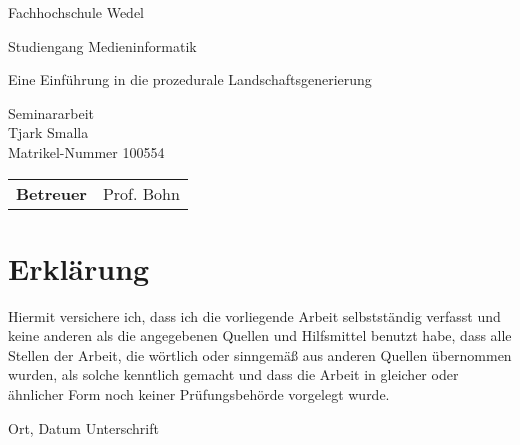 
\pagestyle{empty} %

\clearscrheadings\clearscrplain
\begin{center}
\begin{Huge}
Fachhochschule Wedel\\
\vspace{3mm}
\end{Huge}
{\Large Studiengang Medieninformatik}\\

\vspace{20mm}
\begin{Large}
Eine Einführung in die prozedurale Landschaftsgenerierung\\
\end{Large}
\vspace{8mm}
Seminararbeit\\
\vspace{0.4cm}
\vspace{2 cm}
Tjark Smalla \\
Matrikel-Nummer 100554\\
\vspace{8cm}
\begin{tabular}{rl}
{\bfseries Betreuer} & Prof. Bohn\\
\end{tabular}

\end{center}
\clearpage


\pagestyle{useheadings} %

\tableofcontents %
\listoffigures %
\listoftables %
















\chapter*{Erklärung}

Hiermit versichere ich, dass ich die vorliegende Arbeit selbstständig verfasst und keine anderen als die angegebenen Quellen und Hilfsmittel benutzt habe, dass alle Stellen der Arbeit, die wörtlich oder sinngemäß aus anderen Quellen übernommen wurden, als solche kenntlich gemacht und dass die Arbeit in gleicher oder ähnlicher Form noch keiner Prüfungsbehörde vorgelegt wurde.

\vspace{3cm}
Ort, Datum \hspace{5cm} Unterschrift\\

